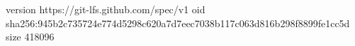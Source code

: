 version https://git-lfs.github.com/spec/v1
oid sha256:945b2c735724e774d5298c620a7d7eec7038b117c063d816b298f8899fe1cc5d
size 418096
